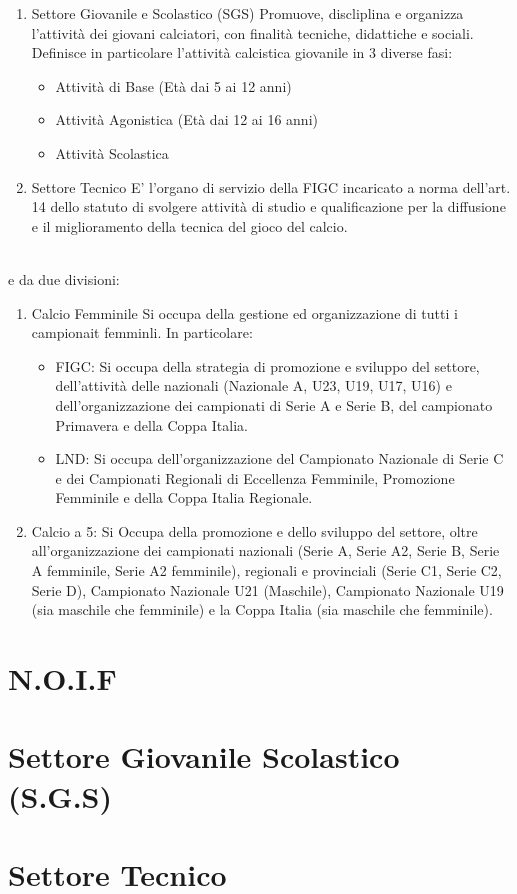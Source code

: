 \documentclass[../uefaC.tex]{subfiles}
\begin{document}
\begin{enumerate}
    \item{Settore Giovanile e Scolastico (SGS)} Promuove, discliplina e organizza l'attività dei giovani calciatori, con finalità tecniche, didattiche e sociali. Definisce in particolare l'attività calcistica giovanile in 3 diverse fasi:
    \begin{itemize}
        \item{Attività di Base} (Età dai 5 ai 12 anni)
        \item{Attività Agonistica} (Età dai 12 ai 16 anni)
        \item{Attività Scolastica}
    \end{itemize}
    \item{Settore Tecnico} E' l'organo di servizio della FIGC incaricato a norma dell'art. 14 dello statuto di svolgere attività di studio e qualificazione per la diffusione e il miglioramento della tecnica del gioco del calcio.
\end{enumerate}
\hfill \\
e da due divisioni:
\begin{enumerate}
    \item{Calcio Femminile} Si occupa della gestione ed organizzazione di tutti i campionait femminli. In particolare:
    \begin{itemize}
        \item{FIGC}: Si occupa della strategia di promozione e sviluppo del settore, dell'attività delle nazionali (Nazionale A, U23, U19, U17, U16) e dell'organizzazione dei campionati di Serie A e Serie B, del campionato Primavera e della Coppa Italia.
        \item{LND}: Si occupa dell'organizzazione del Campionato Nazionale di Serie C e dei Campionati Regionali di Eccellenza Femminile, Promozione Femminile e della Coppa Italia Regionale.
    \end{itemize}
    \item{Calcio a 5}: Si Occupa della promozione e dello sviluppo del settore, oltre all'organizzazione dei campionati nazionali (Serie A, Serie A2, Serie B, Serie A femminile, Serie A2 femminile), regionali e provinciali (Serie C1, Serie C2, Serie D), Campionato Nazionale U21 (Maschile), Campionato Nazionale U19 (sia maschile che femminile) e la Coppa Italia (sia maschile che femminile).
\end{enumerate}

\section{N.O.I.F}

\section{Settore Giovanile Scolastico (S.G.S)}

\section{Settore Tecnico}
\end{document}
